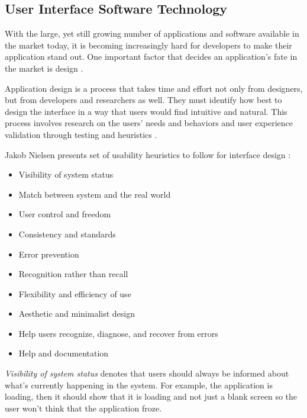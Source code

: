 	\subsection{User Interface Software Technology} 
    \label{sec:uist}
		
        With the large, yet still growing number of applications and software available in the market today, it is becoming increasingly hard for developers to make their application stand out. One important factor that decides an application's fate in the market is design \citep{deka2016datadriven}.

		Application design is a process \citep{curtis1988field,humphrey1995discipline} that takes time and effort not only from designers, but from developers and researchers as well. They must identify how best to design the interface in a way that users would find intuitive and natural. This process involves research on the users' needs and behaviors and user experience validation through testing and heuristics \citep{deka2016datadriven}. 
        
        Jakob Nielsen presents set of usability heuristics to follow for interface design \citep{nielsen1990heuristic, nielsen1994usability, nielsen2013usability}:
        \begin{itemize}
        	\item Visibility of system status
            \item Match between system and the real world
            \item User control and freedom
            \item Consistency and standards
            \item Error prevention
            \item Recognition rather than recall
            \item Flexibility and efficiency of use
            \item Aesthetic and minimalist design
            \item Help users recognize, diagnose, and recover from errors
            \item Help and documentation
		\end{itemize}
		
        \textit{Visibility of system status} denotes that users should always be informed about what's currently happening in the system. For example, the application is loading, then it should show that it is loading and not just a blank screen so the user won't think that the application froze.
        
